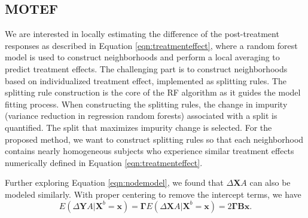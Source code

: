 \documentclass[smallextended]{svjour3}
\begin{document}
\subsection{MOTEF}
We are interested in locally estimating the difference of the post-treatment responses as described in Equation \eqref{eqn:treatmenteffect}, where a random forest model is used to construct neighborhoods and perform a local averaging to predict treatment effects. The challenging part is to construct neighborhoods based on individualized treatment effect, implemented as splitting rules. The splitting rule construction is the core of the RF algorithm as it guides the model fitting process. When constructing the splitting rules, the change in impurity (variance reduction in regression random forests) associated with a split is quantified. The split that maximizes impurity change is selected. For the proposed method, we want to construct splitting rules so that each neighborhood contains nearly homogeneous subjects who experience similar treatment effects numerically defined in Equation \eqref{eqn:treatmenteffect}. 

Further exploring Equation \eqref{eqn:nodemodel}, we found that $\Delta \bm X A$ can also be modeled similarly. With proper centering to remove the intercept terms, we have
\begin{equation}
    E(\Delta \bm Y A | \bm X^b=\bm x) = \bm \Gamma E(\Delta \bm X A | \bm X^b = \bm x) = 2\bm \Gamma \bm B \bm x. \label{eqn:threesides}
\end{equation}
\end{document}
